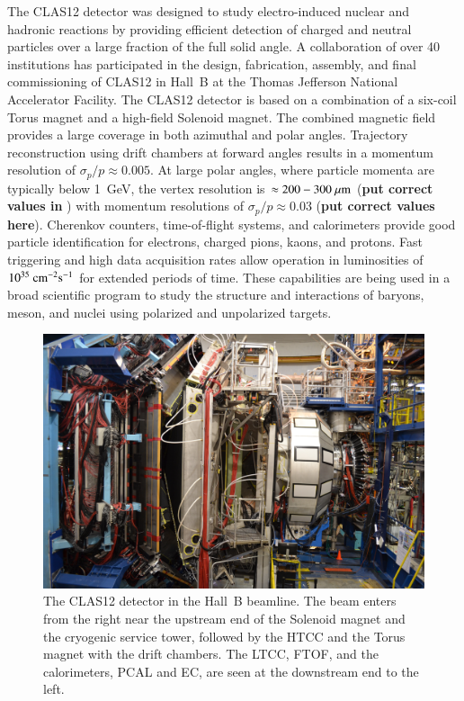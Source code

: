 \documentclass[final,3p,twocolumn]{elsarticle}
\begin{document}
The CLAS12 detector was designed to study electro-induced nuclear and hadronic reactions by providing efficient
detection of charged and neutral particles over a large fraction of the full solid angle. A collaboration of over 40
institutions has participated in the design, fabrication, assembly, and final commissioning of CLAS12 in Hall~B at the
Thomas Jefferson  National Accelerator Facility. The CLAS12 detector is based on a combination of a six-coil Torus
magnet and a high-field Solenoid magnet. The combined magnetic field provides a large coverage in both azimuthal and
polar angles. Trajectory reconstruction using drift chambers at forward angles results in a momentum resolution of
${\sigma_p / p} \approx 0.005$. At large polar angles, where particle momenta are typically below 1~GeV, the vertex
resolution is $\approx 200-300~\mu\rm{m}$ ({\bf put correct values in} ) with momentum resolutions of
$\sigma_p / p \approx 0.03$  ({\bf put correct values here}).  Cherenkov counters, time-of-flight systems, and
calorimeters provide good particle identification for electrons, charged pions, kaons, and protons. Fast triggering and
high data acquisition rates allow operation in luminosities of $10^{35}~\rm{cm}^{-2}\rm{s}^{-1}$ for extended periods of
time. These capabilities are being used in a broad scientific program to study the structure and interactions of baryons,
meson, and nuclei using polarized and unpolarized targets. 

\begin{figure}[bhtp!]
\centerline{\includegraphics[width=1.4\columnwidth]{CLAS12_photo-1.jpg}}
\caption{The CLAS12 detector in the Hall~B beamline. The beam enters from the right near the upstream end of the
Solenoid magnet and the cryogenic service tower, followed by the HTCC and the Torus magnet with the drift chambers.
The LTCC, FTOF, and the calorimeters, PCAL and EC, are seen at the downstream end to the left.}
\label{clas12-photo}
\end{figure}
\end{document}
